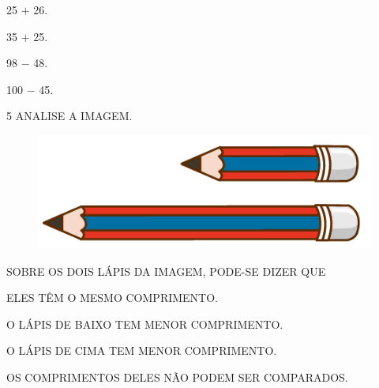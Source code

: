 \begin{minipage}{.5\textwidth}
\begin{escolha}
\item 25 $+$ 26.

\item 35 $+$ 25.

\item 98 $-$ 48.

\item 100 $-$ 45.
\end{escolha}
\end{minipage}

\num{5} ANALISE A IMAGEM.


\begin{figure}[htpb!]
\centering
\includegraphics[width=.5\textwidth]{../ilustracoes/MAT1/SAEB_1ANO_MAT_FIGURA113.png}
\end{figure}

SOBRE OS DOIS LÁPIS DA IMAGEM, PODE-SE DIZER QUE

\begin{escolha}
\item ELES TÊM O MESMO COMPRIMENTO.

\item O LÁPIS DE BAIXO TEM MENOR COMPRIMENTO.

\item O LÁPIS DE CIMA TEM MENOR COMPRIMENTO.

\item OS COMPRIMENTOS DELES NÃO PODEM SER COMPARADOS.
\end{escolha}

